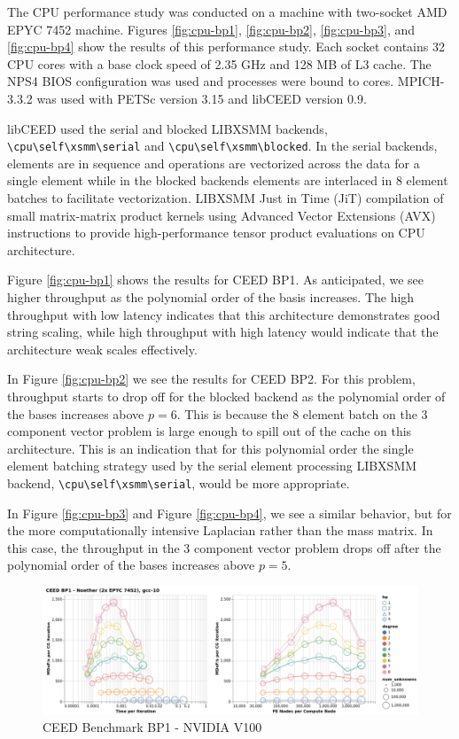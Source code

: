 The CPU performance study was conducted on a machine with two-socket AMD EPYC 7452 machine.
Figures \ref{fig:cpu-bp1}, \ref{fig:cpu-bp2}, \ref{fig:cpu-bp3}, and \ref{fig:cpu-bp4} show the results of this performance study.
Each socket contains 32 CPU cores with a base clock speed of 2.35 GHz and 128 MB of L3 cache.
The NPS4 BIOS configuration was used and processes were bound to cores.
MPICH-3.3.2 was used with PETSc \cite{petsc-user-ref} version 3.15 and libCEED \cite{libceed} version 0.9.

libCEED used the serial and blocked LIBXSMM \cite{libxsmm} backends, \lstinline{\cpu\self\xsmm\serial} and \lstinline{\cpu\self\xsmm\blocked}.
In the serial backends, elements are in sequence and operations are vectorized across the data for a single element while in the blocked backends elements are interlaced in 8 element batches to facilitate vectorization.
LIBXSMM Just in Time (JiT) compilation of small matrix-matrix product kernels using Advanced Vector Extensions (AVX) instructions to provide high-performance tensor product evaluations on CPU architecture.

Figure \ref{fig:cpu-bp1} shows the results for CEED BP1.
As anticipated, we see higher throughput as the polynomial order of the basis increases.
The high throughput with low latency indicates that this architecture demonstrates good string scaling, while high throughput with high latency would indicate that the architecture weak scales effectively.

In Figure \ref{fig:cpu-bp2} we see the results for CEED BP2.
For this problem, throughput starts to drop off for the blocked backend as the polynomial order of the bases increases above $p = 6$.
This is because the 8 element batch on the 3 component vector problem is large enough to spill out of the cache on this architecture.
This is an indication that for this polynomial order the single element batching strategy used by the serial element processing LIBXSMM backend, \lstinline{\cpu\self\xsmm\serial}, would be more appropriate.

In Figure \ref{fig:cpu-bp3} and Figure \ref{fig:cpu-bp4}, we see a similar behavior, but for the more computationally intensive Laplacian rather than the mass matrix.
In this case, the throughput in the 3 component vector problem drops off after the polynomial order of the bases increases above $p = 5$.

\begin{figure}[ht!]
\includegraphics[width=.99\linewidth]{../img/xsmmSerialBP1Clip}
\caption{CEED Benchmark BP1 - NVIDIA V100}
\label{fig:gpu-bp1}
\end{figure}

